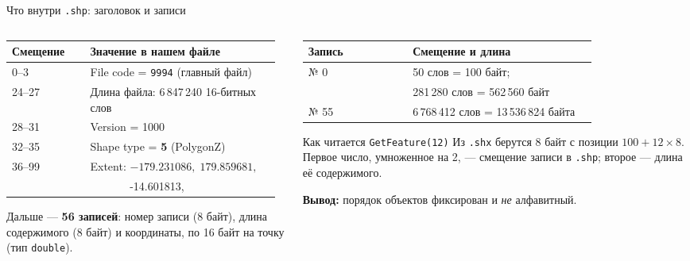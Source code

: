 \documentclass[aspectratio=169,10pt]{beamer}
\begin{document}
\begin{frame}{Что внутри \texttt{.shp}: заголовок и записи}
\footnotesize
\begin{columns}[T,onlytextwidth]
  \begin{column}{0.51\textwidth}
    \begin{tabular}{@{}p{0.28\linewidth}p{0.68\linewidth}@{}}
      \toprule
      Смещение & Значение в нашем файле \\
      \midrule
      0--3   & File code = \texttt{9994} (главный файл) \\
      24--27 & Длина файла: 6\,847\,240 16-битных слов \\
      28--31 & Version = 1000 \\
      32--35 & Shape type = \textbf{5} (PolygonZ) \\
      36--99 & Extent: $-179.231086,\;179.859681,$\\
             & $\phantom{Extent:}$-14.601813,\;71.441059 \\
      \bottomrule
    \end{tabular}
    \vspace{0.4em}
    {\scriptsize Дальше --- \textbf{56 записей}: номер записи (8 байт),
    длина содержимого (8 байт) и координаты, по 16 байт на точку
    (тип \texttt{double}).}
  \end{column}
  \begin{column}{0.47\textwidth}
    \begin{tabular}{@{}p{0.34\linewidth}p{0.6\linewidth}@{}}
      \toprule
      Запись & Смещение и длина \\
      \midrule
      № 0  & 50 слов = 100 байт; \\
            & 281\,280 слов = 562\,560 байт \\
      № 55 & 6\,768\,412 слов = 13\,536\,824 байта \\
      \bottomrule
    \end{tabular}
    \vspace{0.5em}
    \begin{block}{Как читается \texttt{GetFeature(12)}}\small
      Из \texttt{.shx} берутся 8 байт с позиции $100+12\times8$.
      Первое число, умноженное на 2, --- смещение записи в \texttt{.shp};
      второе --- длина её содержимого.
    \end{block}
    \vspace{0.2em}
    {\scriptsize \textbf{Вывод:} порядок объектов фиксирован и
     \emph{не} алфавитный.}
  \end{column}
\end{columns}
\end{frame}
\end{document}
